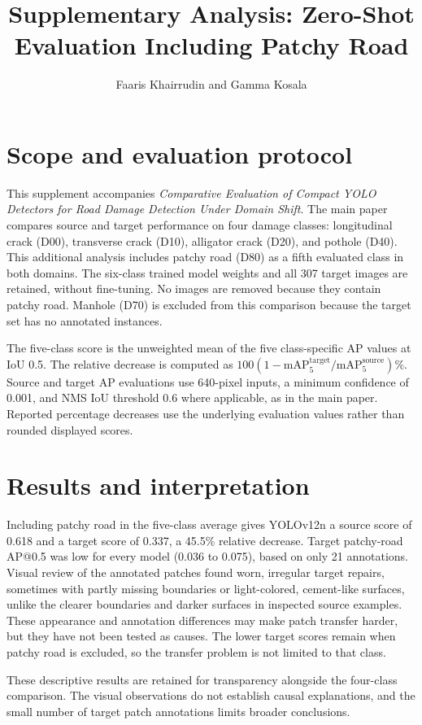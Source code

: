 \documentclass[10pt]{article}
\title{Supplementary Analysis: Zero-Shot Evaluation Including Patchy Road}
\author{Faaris Khairrudin and Gamma Kosala}
\date{}
\begin{document}
\maketitle
\section*{Scope and evaluation protocol}
This supplement accompanies \emph{Comparative Evaluation of Compact YOLO Detectors for Road Damage Detection Under Domain Shift}. The main paper compares source and target performance on four damage classes: longitudinal crack (D00), transverse crack (D10), alligator crack (D20), and pothole (D40). This additional analysis includes patchy road (D80) as a fifth evaluated class in both domains. The six-class trained model weights and all 307 target images are retained, without fine-tuning. No images are removed because they contain patchy road. Manhole (D70) is excluded from this comparison because the target set has no annotated instances.

The five-class score is the unweighted mean of the five class-specific AP values at IoU 0.5. The relative decrease is computed as $100(1-\mathrm{mAP}^{\mathrm{target}}_5/\mathrm{mAP}^{\mathrm{source}}_5)\%$. Source and target AP evaluations use 640-pixel inputs, a minimum confidence of 0.001, and NMS IoU threshold 0.6 where applicable, as in the main paper. Reported percentage decreases use the underlying evaluation values rather than rounded displayed scores.
\section*{Results and interpretation}
Including patchy road in the five-class average gives YOLOv12n a source score of 0.618 and a target score of 0.337, a 45.5\% relative decrease. Target patchy-road AP@0.5 was low for every model (0.036 to 0.075), based on only 21 annotations. Visual review of the annotated patches found worn, irregular target repairs, sometimes with partly missing boundaries or light-colored, cement-like surfaces, unlike the clearer boundaries and darker surfaces in inspected source examples. These appearance and annotation differences may make patch transfer harder, but they have not been tested as causes. The lower target scores remain when patchy road is excluded, so the transfer problem is not limited to that class.

These descriptive results are retained for transparency alongside the four-class comparison. The visual observations do not establish causal explanations, and the small number of target patch annotations limits broader conclusions.
\end{document}
